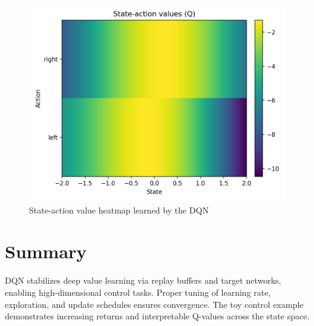 ﻿\documentclass[12pt]{article}
\begin{document}
\begin{figure}[H]
  \centering
  \includegraphics[width=0.82\linewidth]{dqn_q_values.png}
  \caption{State-action value heatmap learned by the DQN}
  \label{fig:dqn_q_values}
\end{figure}

\FloatBarrier
\section{Summary}
DQN stabilizes deep value learning via replay buffers and target networks, enabling high-dimensional control tasks. Proper tuning of learning rate, exploration, and update schedules ensures convergence. The toy control example demonstrates increasing returns and interpretable Q-values across the state space.
\end{document}

